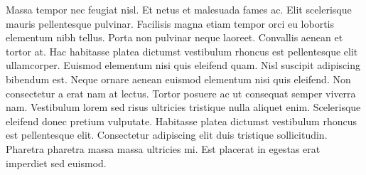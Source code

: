 \documentclass[11pt,a4paper]{article}
\begin{document}
Massa tempor nec feugiat nisl. Et netus et malesuada fames ac. Elit scelerisque mauris pellentesque pulvinar. Facilisis magna etiam tempor orci eu lobortis elementum nibh tellus. Porta non pulvinar neque laoreet. Convallis aenean et tortor at. Hac habitasse platea dictumst vestibulum rhoncus est pellentesque elit ullamcorper. Euismod elementum nisi quis eleifend quam. Nisl suscipit adipiscing bibendum est. Neque ornare aenean euismod elementum nisi quis eleifend. Non consectetur a erat nam at lectus. Tortor posuere ac ut consequat semper viverra nam. Vestibulum lorem sed risus ultricies tristique nulla aliquet enim. Scelerisque eleifend donec pretium vulputate. Habitasse platea dictumst vestibulum rhoncus est pellentesque elit. Consectetur adipiscing elit duis tristique sollicitudin. Pharetra pharetra massa massa ultricies mi. Est placerat in egestas erat imperdiet sed euismod.
\end{document}
